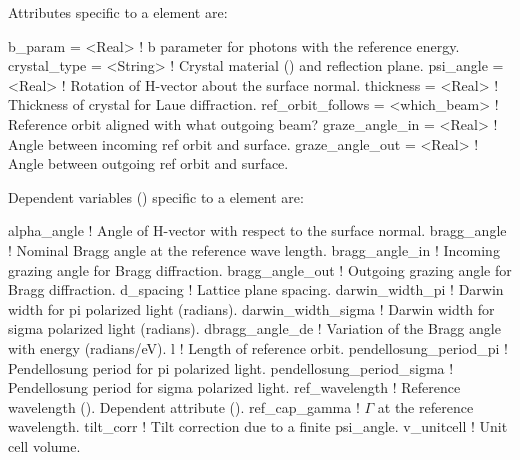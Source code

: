 Attributes specific to a  element are:
\begin{example}
  b_param            = <Real>       ! b parameter for photons with the reference energy.
  crystal_type       = <String>     ! Crystal material () and reflection plane.
  psi_angle          = <Real>       ! Rotation of H-vector about the surface normal.
  thickness          = <Real>       ! Thickness of crystal for Laue diffraction.
  ref_orbit_follows  = <which_beam> ! Reference orbit aligned with what outgoing beam?
  graze_angle_in     = <Real>       ! Angle between incoming ref orbit and surface.
  graze_angle_out    = <Real>       ! Angle between outgoing ref orbit and surface.
\end{example}


Dependent variables () specific to a  element are:
\begin{example}
  alpha_angle                ! Angle of H-vector with respect to the surface normal.
  bragg_angle                ! Nominal Bragg angle at the reference wave length. 
  bragg_angle_in             ! Incoming grazing angle for Bragg diffraction.
  bragg_angle_out            ! Outgoing grazing angle for Bragg diffraction.
  d_spacing                  ! Lattice plane spacing. 
  darwin_width_pi            ! Darwin width for pi polarized light (radians).
  darwin_width_sigma         ! Darwin width for sigma polarized light (radians).
  dbragg_angle_de            ! Variation of the Bragg angle with energy (radians/eV).
  l                          ! Length of reference orbit.
  pendellosung_period_pi     ! Pendellosung period for pi polarized light.
  pendellosung_period_sigma  ! Pendellosung period for sigma polarized light.
  ref_wavelength             ! Reference wavelength (). Dependent attribute ().
  ref_cap_gamma              ! \(\Gamma\) at the reference wavelength.
  tilt_corr                  ! Tilt correction due to a finite psi_angle.
  v_unitcell                 ! Unit cell volume. 
\end{example}

